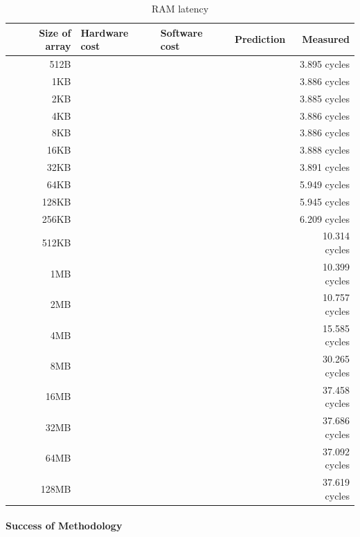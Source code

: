 \begin{table}[h]
\begin{center}
\begin{tabular}{| r | l | l | l | r |}
\hline
Size of array 	& Hardware cost 	& Software cost 	& Prediction 	& Measured \\ \hline
512B 			&				&				&			&3.895 cycles	\\ \hline
1KB 			&				&				&			&3.886 cycles		\\ \hline
2KB 			&				&				&			&3.885 cycles		\\ \hline
4KB 			&				&				&			&3.886 cycles		\\ \hline
8KB 			&				&				&			&3.886 cycles		\\ \hline
16KB 			&				&				&			&3.888 cycles		\\ \hline
32KB 			&				&				&			&3.891 cycles		\\ \hline
64KB 			&				&				&			&5.949 cycles		\\ \hline
128KB 		&				&				&			&5.945 cycles		\\ \hline
256KB 		&				&				&			&6.209 cycles		\\ \hline
512KB 		&				&				&			&10.314 cycles		\\ \hline
1MB 			&				&				&			&10.399 cycles		\\ \hline
2MB 			&				&				&			&10.757 cycles		\\ \hline
4MB 			&				&				&			&15.585 cycles		\\ \hline
8MB 			&				&				&			&30.265 cycles		\\ \hline
16MB 			&				&				&			&37.458 cycles		\\ \hline
32MB 			&				&				&			&37.686 cycles		\\ \hline
64MB 			&				&				&			&37.092 cycles		\\ \hline
128MB 		&				&				&			&37.619 cycles		\\ \hline

\hline
\end{tabular}
\end{center}
\label{access-time-table}
\caption{RAM latency}
\end{table}
\paragraph{Success of Methodology}



